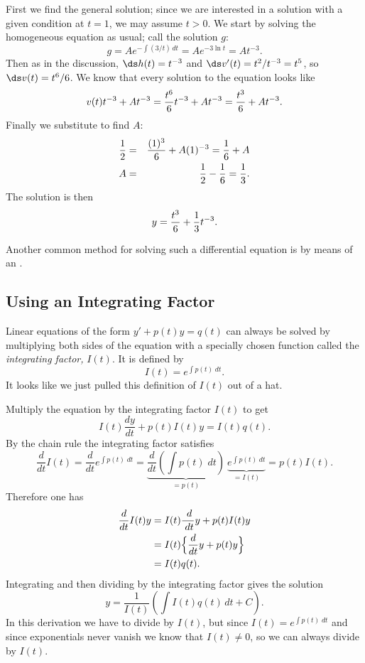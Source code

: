 \begin{solution}
First we find the general solution;
since we are interested in a solution with a given condition at $t=1$,
we may assume $t>0$.
We start by solving the homogeneous equation as usual; call the
solution $g$:
$$g=Ae^{-\int (3/t)\,dt}=Ae^{-3\ln t}=At^{-3}.$$
Then as in the discussion, $\ds h(t)=t^{-3}$ and
$\ds v'(t)=t^2/t^{-3}=t^5$, so $\ds v(t)=t^6/6$. We know that
every solution to the equation looks like
$$v(t)t^{-3}+At^{-3}={t^6\over6}t^{-3}+At^{-3}={t^3\over6}+At^{-3}.$$
Finally we substitute to find $A$:
\begin{eqnarray*}
{1\over 2}&=&{(1)^3\over6}+A(1)^{-3}={1\over6}+A\cr
A&=&{1\over 2}-{1\over6}={1\over3}.
\end{eqnarray*}
The solution is then
$$y={t^3\over6}+{1\over3}t^{-3}.$$
\end{solution}

Another common method for solving such a differential equation is by means of an
. 

\subsection*{Using an Integrating Factor}
\label{sec:integrating-factor}

Linear equations of the form $ y'+p(t)y=q(t) $ can always be solved by multiplying both sides of the equation
with a specially chosen function called the \emph{integrating factor,} $ I(t)$.  It is
defined by
\begin{equation}
I (t) = e^{\int p(t)\; dt}.
  \label{eq:integrating-factor-defined}
\end{equation}
 It looks like we just pulled this definition
of $I(t)$ out of a hat.  

Multiply the equation by the integrating factor
$I(t)$ to get
\[
I(t)\frac{d y}{d t}+p(t)I(t)y = I(t)q(t).
\]
By the chain rule the integrating factor satisfies
\[
\frac{ d }{d t}I(t) = \frac{d} {d t} e^{\int p(t)\; dt}
= \underbrace{\frac{d} {d t} \left( \int p(t)\; dt\right)}_{=p(t)} ~\underbrace{e^{\int p(t)\; dt}_{}}_{=I(t)}
= p(t)I(t).
\]
Therefore one has
\begin{align*}
  \frac{d }{d t}I(t)y
  &= I(t)\frac{\; d }{\; d t}y +p(t)I(t)y \\
  &= I(t)\Bigl\{\frac{d}{d t} y+p(t)y \Bigr\}\\
  &= I(t)q(t).
\end{align*}
Integrating and then dividing by the integrating factor gives the solution
\[
y=\frac1{I(t)}\left(\int I(t)q(t)\,d t+C\right).
\]
In this derivation we have to divide by $I(t)$, but since $I(t)=e^{\int p(t)\; dt}$ and since
exponentials never vanish we know that $I (t)\neq0$, so we can always divide by $I
(t)$.


